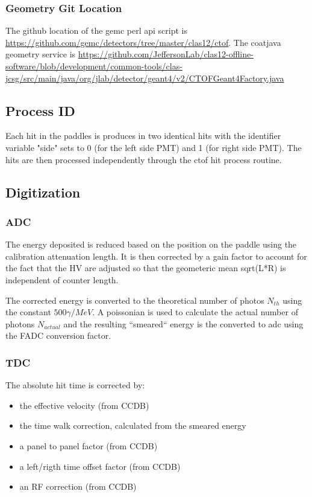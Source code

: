 \subsubsection{Geometry Git Location}
The github location of the gemc perl api script is \url{https://github.com/gemc/detectors/tree/master/clas12/ctof}.
The coatjava geometry service is \url{https://github.com/JeffersonLab/clas12-offline-software/blob/development/common-tools/clas-jcsg/src/main/java/org/jlab/detector/geant4/v2/CTOFGeant4Factory.java}

\subsection{Process ID}

Each hit in the paddles is produces in two identical hits with the identifier variable "side" sets to 0 (for the left side PMT) and 1 (for right side PMT).
The hits are then processed independently through the ctof hit process routine.

\subsection{Digitization}

\subsubsection{ADC}

The energy deposited is reduced based on the position on the paddle using the calibration attenuation length. It is then corrected by a gain factor
to account for the fact that the HV are adjusted so that the geometeric mean sqrt(L*R) is independent of counter length.

The corrected energy is converted to the theoretical number of photos $N_{th}$ using the constant $500 \gamma / MeV $. A poissonian is used to
calculate the actual number of photons $N_{actual}$ and the resulting ``smeared`` energy is the converted to adc using the FADC conversion factor.


\subsubsection{TDC}

The absolute hit time is corrected by:

\begin{itemize}
	\item the effective velocity (from CCDB)
	\item the time walk correction, calculated from the smeared energy
	\item a panel to panel factor (from CCDB)
	\item a left/rigth time offset factor (from CCDB)
	\item an RF correction (from CCDB)
\end{itemize}

